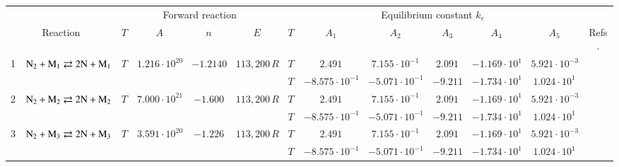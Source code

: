 \documentclass{warpdoc}
\renewcommand{\fontsizetable}{\footnotesize\scalefont{0.9}}
\begin{document}
%
\begin{table}[!ht]
\fontsizetable
\begin{center}
\begin{threeparttable}
\setlength\tabcolsep{1.5pt}
\begin{tabular}{ccccccccccccc} 
\toprule
~&~&\multicolumn{4}{c}{Forward reaction} & \multicolumn{6}{c}{Equilibrium constant $k_e$} & ~\\
 \cmidrule(lr){3-6}\cmidrule(lr){7-12}
\multicolumn{2}{c}{Reaction} & $T$ & $A$ & $n$ & $E$ & $T$  & $A_1$ & $A_2$ & $A_3$ &$A_4$& $A_5$ & \multicolumn{1}{c}{Refs.}\\ 
\midrule
1 & $\rm N_2 + M_1 \rightleftarrows 2N+M_1$ &$T$ & $1.216 \cdot 10^{20}$  & $-1.2140$    & $113,200\, R$  
                                          &$T$  & $2.491$  & $7.155 \cdot 10^{-1}$  & $2.091$ & $-1.169 \cdot 10^{1}$ & $5.921 \cdot 10^{-3}$ & \multirow{2}{*}{\cite{jcp:2015:bender,jtht:2018:jaffe,ijhmt:2021:kim}}\\
 & & & & &                                &$T$  & $-8.575 \cdot 10^{-1}$  & $-5.071 \cdot 10^{-1}$  & $-9.211$ & $-1.734 \cdot 10^{1}$ & $1.024 \cdot 10^{1}$ & ~\\                                          
                                          
2 & $\rm N_2 + M_2 \rightleftarrows 2N+M_2$ &$T$  & $7.000 \cdot 10^{21}$ & $-1.600$ & $113,200\, R$ 
                                          &$T$  & $2.491$  & $7.155 \cdot 10^{-1}$  & $2.091$ & $-1.169 \cdot 10^{1}$ & $5.921 \cdot 10^{-3}$ & \multirow{2}{*}{\cite{jtht:1993:park,jtht:2001:park,ijhmt:2021:kim}}\\
 & & & & &                                &$T$  & $-8.575 \cdot 10^{-1}$  & $-5.071 \cdot 10^{-1}$  & $-9.211$ & $-1.734 \cdot 10^{1}$ & $1.024 \cdot 10^{1}$ &~\\                                          
                                          
3 & $\rm N_2 + M_3 \rightleftarrows 2N+M_3$ &$T$  & $3.591 \cdot 10^{20}$ & $-1.226$ & $113,200\, R$ 
                                          &$T$  & $2.491$  & $7.155 \cdot 10^{-1}$  & $2.091$ & $-1.169 \cdot 10^{1}$ & $5.921 \cdot 10^{-3}$ & \multirow{2}{*}{\cite{cp:2013:kim,ijhmt:2021:kim}}\\
 & & & & &                                &$T$  & $-8.575 \cdot 10^{-1}$  & $-5.071 \cdot 10^{-1}$  & $-9.211$ & $-1.734 \cdot 10^{1}$ & $1.024 \cdot 10^{1}$ &~\\                                          
                                          

\end{tabular}
\end{threeparttable}
\end{center}
\end{table}
\end{document}
